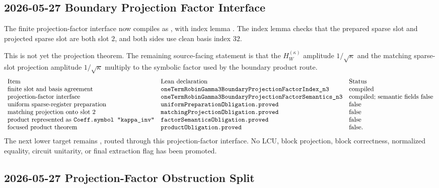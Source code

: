 \subsection{2026-05-27 Boundary Projection Factor Interface}

The finite projection-factor interface now compiles as
,
with index lemma
.
The index lemma checks that the prepared sparse slot and projected sparse slot
are both slot \(2\), and both sides use clean basis index \(32\).

This is not yet the projection theorem.  The remaining source-facing statement
is that the \(H_W^{(\kappa)}\) amplitude \(1/\sqrt{\kappa}\) and the matching
sparse-slot projection amplitude \(1/\sqrt{\kappa}\) multiply to the symbolic
factor  used by the boundary product route.
\[
\begin{array}{lll}
\text{Item} & \text{Lean declaration} & \text{Status}\\
\text{finite slot and basis agreement} &
\texttt{oneTermRobinGamma3BoundaryProjectionFactorIndex\_n3} &
\text{compiled}\\
\text{projection-factor interface} &
\texttt{oneTermRobinGamma3BoundaryProjectionFactorSemantics\_n3} &
\text{compiled; semantic fields false}\\
\text{uniform sparse-register preparation} &
\texttt{uniformPreparationObligation.proved} & \text{false}\\
\text{matching projection onto slot }2 &
\texttt{matchingProjectionObligation.proved} & \text{false}\\
\text{product represented as }\texttt{Coeff.symbol "kappa\_inv"} &
\texttt{factorSemanticsObligation.proved} & \text{false}\\
\text{focused product theorem} &
\texttt{productObligation.proved} & \text{false}.
\end{array}
\]
The next lower target remains
, routed through
this projection-factor interface.  No LCU, block projection, block correctness,
normalized equality, circuit unitarity, or final extraction flag has been
promoted.

\subsection{2026-05-27 Projection-Factor Obstruction Split}

